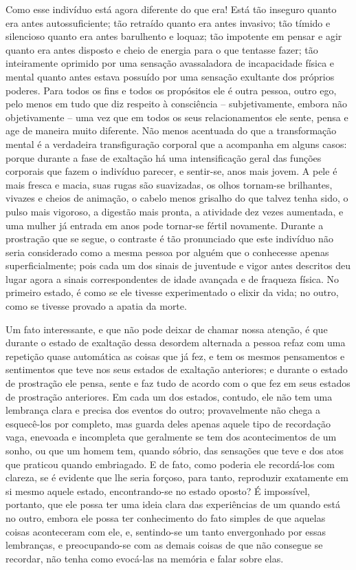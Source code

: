 Como esse indivíduo está agora diferente do que era!  Está tão inseguro
quanto era antes autossuficiente; tão retraído quanto era antes
invasivo; tão tímido e silencioso quanto era antes barulhento e loquaz;
tão impotente em pensar e agir quanto era antes disposto e cheio de
energia para o que tentasse fazer; tão inteiramente oprimido por uma
sensação avassaladora de incapacidade física e mental quanto antes
estava possuído por uma sensação exultante dos próprios poderes.  Para
todos os fins e todos os propósitos ele é outra pessoa, outro ego, pelo
menos em tudo que diz respeito à consciência -- subjetivamente, embora
não objetivamente -- uma vez que em todos os seus relacionamentos ele
sente, pensa e age de maneira muito diferente.  Não menos acentuada do
que a transformação mental é a verdadeira transfiguração corporal que a
acompanha em alguns casos: porque durante a fase de exaltação há uma
intensificação geral das funções corporais que fazem o indivíduo
parecer, e sentir-se, anos mais jovem.  A pele é mais fresca e macia,
suas rugas são suavizadas, os olhos tornam-se brilhantes, vivazes e
cheios de animação, o cabelo menos grisalho do que talvez tenha sido, o
pulso mais vigoroso, a digestão mais pronta, a atividade dez vezes
aumentada, e uma mulher já entrada em anos pode tornar-se fértil
novamente.  Durante a prostração que se segue, o contraste é tão
pronunciado que este indivíduo não seria considerado como a mesma
pessoa por alguém que o conhecesse apenas superficialmente; pois cada
um dos sinais de juventude e vigor antes descritos deu lugar agora a
sinais correspondentes de idade avançada e de fraqueza física.  No
primeiro estado, é como se ele tivesse experimentado o elixir da vida;
no outro, como se tivesse provado a apatia da morte. 

Um fato interessante, e que não pode deixar de chamar nossa atenção, é
que durante o estado de exaltação dessa desordem alternada a pessoa refaz
com uma repetição quase automática as coisas que já fez, e tem os mesmos
pensamentos e sentimentos que teve nos seus estados de exaltação
anteriores; e durante o estado de prostração ele pensa, sente e faz
tudo de acordo com o que fez em seus estados de prostração anteriores.
Em cada um dos estados, contudo, ele não tem uma lembrança clara e
precisa dos eventos do outro; provavelmente não chega a esquecê-los por
completo, mas guarda deles apenas aquele tipo de recordação vaga,
enevoada e incompleta que geralmente se tem dos acontecimentos de um
sonho, ou que um homem tem, quando sóbrio, das sensações que teve e dos
atos que praticou quando embriagado.  E de fato, como poderia ele
recordá-los com clareza, se é evidente que lhe seria forçoso, para
tanto, reproduzir exatamente em si mesmo aquele estado, encontrando-se
no estado oposto? É impossível, portanto, que ele possa ter uma ideia
clara das experiências de um quando está no outro, embora ele possa ter
conhecimento do fato simples de que aquelas coisas aconteceram com ele,
e, sentindo-se um tanto envergonhado por essas lembranças, e
preocupando-se com as demais coisas de que não consegue se recordar,
não tenha como evocá-las na memória e falar sobre elas.

